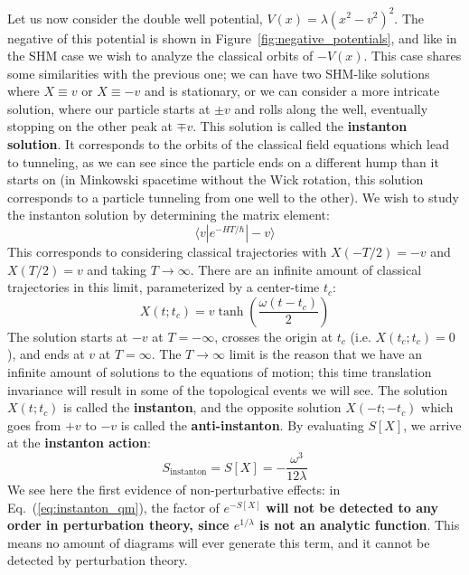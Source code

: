 \documentclass[11pt, oneside]{article}   	%
\theoremstyle{definition}
\begin{document}
Let us now consider the double well potential, $V(x) = \lambda (x^2 - v^2)^2$. The negative of this potential is shown in 
Figure~\ref{fig:negative_potentials}, and like in the SHM case we wish to analyze the classical orbits of $-V(x)$. This case shares some 
similarities with the previous one; we can have two SHM-like solutions where $X \equiv v$ or $X\equiv -v$ and is stationary, or we can 
consider a more intricate solution, where our particle starts at $\pm v$ and rolls along the well, eventually stopping on the other peak at $\mp 
v$. This solution is called the \textbf{instanton solution}. It corresponds to the orbits of the classical field equations which lead to 
tunneling, as we can see since the particle ends on a different hump than it starts on (in Minkowski spacetime without the Wick rotation, this 
solution corresponds to a particle tunneling from one well to the other). We wish to study the instanton solution by determining the matrix element:
\begin{equation}
	\langle v | e^{-HT / \hbar} | -v\rangle
\end{equation}
This corresponds to considering classical trajectories with $X(-T / 2) = -v$ and $X(T / 2) = v$ and taking $T\rightarrow\infty$. There are an 
infinite amount of classical trajectories in this limit, parameterized by a center-time $t_c$:
\begin{equation}
	X(t; t_c) = v \tanh\left(\frac{\omega (t - t_c)}{2}\right)
\end{equation}
The solution starts at $-v$ at $T = -\infty$, crosses the origin at $t_c$ (i.e. $X(t_c; t_c) = 0$), and ends at $v$ at $T = \infty$. The $T\rightarrow\infty$ 
limit is the reason that we have an infinite amount of solutions to the equations of motion; this time translation invariance will result in some of the 
topological events we will see. The solution $X(t; t_c)$ is called the \textbf{instanton}, and the opposite solution $X(-t; -t_c)$ which goes from $+v$ to $-v$ 
is called the \textbf{anti-instanton}. By evaluating $S[X]$, we arrive at the \textbf{instanton action}:
\begin{equation}
	S_\mathrm{instanton} = S[X] = -\frac{\omega^3}{12\lambda}
\end{equation}
We see here the first evidence of non-perturbative effects: in Eq.~(\ref{eq:instanton_qm}), the factor of $e^{-S[X]}$ \textbf{will not be 
detected to any order in perturbation theory, since $e^{1/\lambda}$ is not an analytic function}. This means no amount of diagrams will ever 
generate this term, and it cannot be detected by perturbation theory. 
\end{document}
